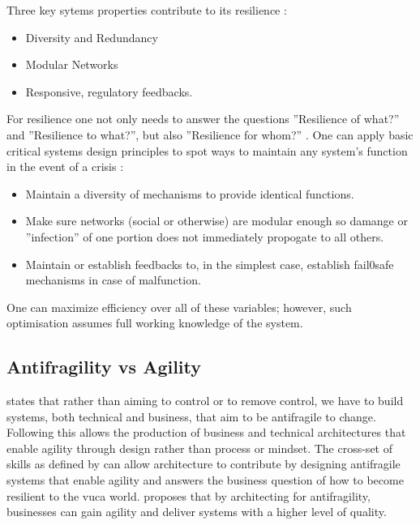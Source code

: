 Three key sytems properties contribute to its resilience \parencite[p. 9]{MartinBreen2011}:
\begin{itemize}
	\item{Diversity and Redundancy}
	\item{Modular Networks}
	\item{Responsive, regulatory feedbacks.}
\end{itemize}
For resilience one not only needs to answer the questions ''Resilience of what?'' and ''Resilience to what?'', but also ''Resilience for whom?'' \parencite[p. 21]{Lebel2006}. One can apply basic critical systems design principles to spot ways to maintain any system's function in the event of a crisis \parencite[p. 10]{MartinBreen2011}:
\begin{itemize}
	\item{Maintain a diversity of mechanisms to provide identical functions.}
	\item{Make sure networks (social or otherwise) are modular enough so damange or ''infection'' of one portion does not immediately propogate to all others.}
	\item{Maintain or establish feedbacks to, in the simplest case, establish fail0safe mechanisms in case of malfunction.}
\end{itemize}
One can maximize efficiency over all of these variables; however, such optimisation assumes full working knowledge of the system.






\newpage
\subsection{Antifragility vs Agility}
\label{tb:antifragile_vs_agility}
\textcite[Abstract]{OReilly2019} states that rather than aiming to control or to remove control, we have to build systems, both technical and business, that aim to be \gls{antifragile} to change. Following \textcite[Abstract]{OReilly2019} this allows the production of business and technical architectures that enable \gls{agility} through design rather than process or mindset. The cross-set of skills as defined by \textcite[p.~889]{OReilly2019} can allow architecture to contribute by designing \gls{antifragile} systems that enable \gls{agility} and answers the business question of how to become \gls{resilient} to the \acrshort{vuca} world. \textcite[p.~885]{OReilly2019} proposes that by architecting for \gls{antifragility}, businesses can gain \gls{agility} and deliver systems with a higher level of quality.

